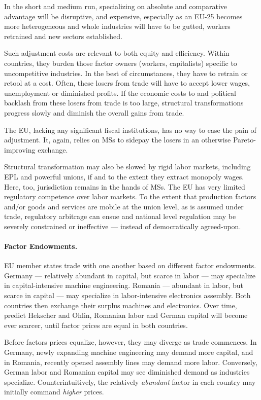\documentclass[11pt,a4paper,oneside,openright]{article}
\begin{document}
In the short and medium run, specializing on absolute and comparative advantage will be disruptive, and expensive, especially as an \gls{EU}-25 becomes more heterogeneous and whole industries will have to be gutted, workers retrained and new sectors established. 

Such adjustment costs are relevant to both equity and efficiency. Within countries, they burden those factor owners (workers, capitalists) specific to uncompetitive industries. 
In the best of circumstances, they have to retrain or retool at a cost. 
Often, these losers from trade will have to accept lower wages, unemployment or diminished profits. 
If the economic costs to and political backlash from these losers from trade is too large, structural transformations progress slowly and diminish the overall gains from trade.

The \gls{EU}, lacking any significant fiscal institutions, has no way to ease the pain of adjustment. 
It, again, relies on \glspl{MS} to sidepay the losers in an otherwise Pareto-improving exchange. %

Structural transformation may also be slowed by rigid labor markets, including \gls{EPL} and powerful unions, if and to the extent they extract monopoly wages. 
Here, too, jurisdiction remains in the hands of \glspl{MS}. 
The \gls{EU} has very limited regulatory competence over labor markets. 
To the extent that production factors and/or goods and services are mobile at the union level, as is assumed under trade, regulatory arbitrage can ensue and national level regulation may be severely constrained or ineffective --- instead of democratically agreed-upon.

\paragraph{Factor Endowments.} 
\gls{EU} member states trade with one another based on different factor endowments. Germany --- relatively abundant in capital, but scarce in labor --- may specialize in capital-intensive machine engineering. 
Romania --- abundant in labor, but scarce in capital --- may specialize in labor-intensive electronics assembly. 
Both countries then exchange their surplus machines and electronics. 
Over time, predict Hekscher and Ohlin, Romanian labor and German capital will become ever scarcer, until factor prices are equal in both countries. %

Before factors prices equalize, however, they may diverge as trade commences. 
In Germany, newly expanding machine engineering may demand more capital, and in Romania, recently opened assembly lines may demand more labor. 
Conversely, German labor and Romanian capital may see diminished demand as industries specialize. 
Counterintuitively, the relatively \emph{abundant} factor in each country may initially command \emph{higher} prices. 
\end{document}

